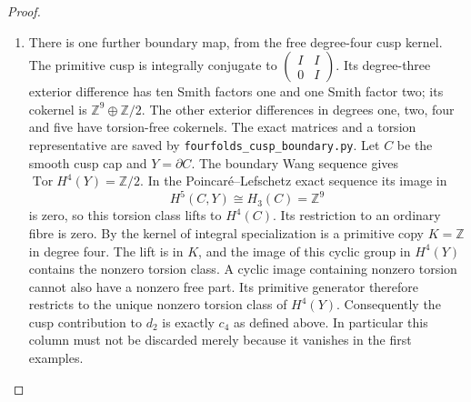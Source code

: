 \begin{proof}
\begin{enumerate}[label={$\langle1\rangle$\arabic*.}]
\item There is one further boundary map, from the free
degree-four cusp kernel.
The primitive cusp is integrally conjugate to
$\left(\begin{smallmatrix}I&I\\0&I\end{smallmatrix}\right)$.
Its degree-three exterior difference has ten Smith
factors one and one Smith factor two; its cokernel is
$\mathbb Z^9\oplus\mathbb Z/2$.
The other exterior differences in degrees one, two,
four and five have torsion-free cokernels.
The exact matrices and a torsion representative are
saved by \texttt{fourfolds\_cusp\_boundary.py}.
Let $C$ be the smooth cusp cap and $Y=\partial C$.
The boundary Wang sequence gives
$\operatorname{Tor}H^4(Y)=\mathbb Z/2$.
In the Poincar\'e--Lefschetz exact sequence its image in
\[
 H^5(C,Y)\cong H_3(C)=\mathbb Z^9
\]
is zero, so this torsion class lifts to $H^4(C)$.
Its restriction to an ordinary fibre is zero.
By  the kernel of integral specialization is
a primitive copy $K=\mathbb Z$ in degree four.
The lift is in $K$, and the image of this cyclic group
in $H^4(Y)$ contains the nonzero torsion class.
A cyclic image containing nonzero torsion cannot
also have a nonzero free part.
Its primitive generator therefore restricts to the
unique nonzero torsion class of $H^4(Y)$.
Consequently the cusp contribution to $d_2$ is
exactly $c_4$ as defined above.  In particular this
column must not be discarded merely because it
vanishes in the first examples.


\end{enumerate}
\end{proof}
